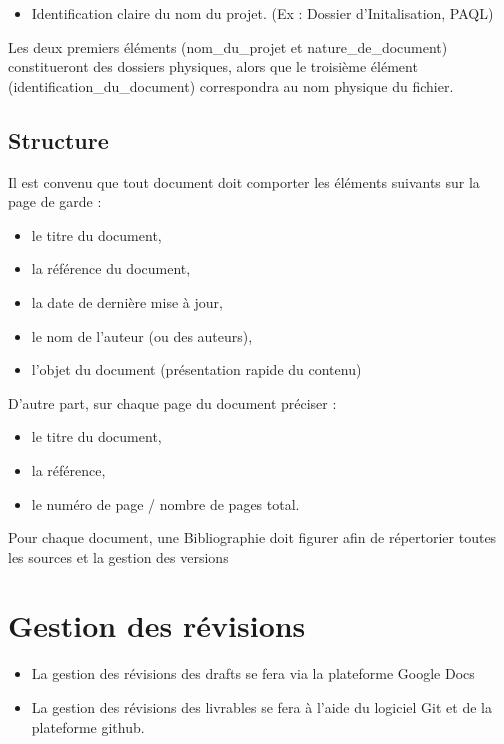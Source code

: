 \documentclass{mise_en_page}
\begin{document}
\begin{itemize}
\item Identification claire du nom du projet. (Ex : Dossier
d’Initalisation, PAQL)
\end{itemize}



Les deux premiers éléments (nom\_du\_projet et nature\_de\_document)
constitueront des dossiers physiques, alors que le troisième élément
(identification\_du\_document) correspondra au nom physique du fichier.




\subsection{Structure}
Il est convenu que tout document doit comporter les éléments suivants
sur la page de garde :

\begin{itemize}
\item le titre du document,
\item la référence du document,
\item la date de dernière mise à jour,
\item le nom de l’auteur (ou des auteurs),
\item l’objet du document (présentation rapide du contenu)
\end{itemize}



D’autre part, sur chaque page du document préciser :

\begin{itemize}
\item le titre du document,
\item la référence,
\item le numéro de page / nombre de pages total.
\end{itemize}



Pour chaque document, une Bibliographie doit figurer afin de répertorier
toutes les sources et la gestion des versions

\section{Gestion des révisions}



\begin{itemize}
\item La gestion des révisions des drafts se fera via la plateforme
Google Docs
\end{itemize}
\begin{itemize}
\item La gestion des révisions des livrables se fera à l’aide du
logiciel Git et de la plateforme github.
\end{itemize}
\end{document}
